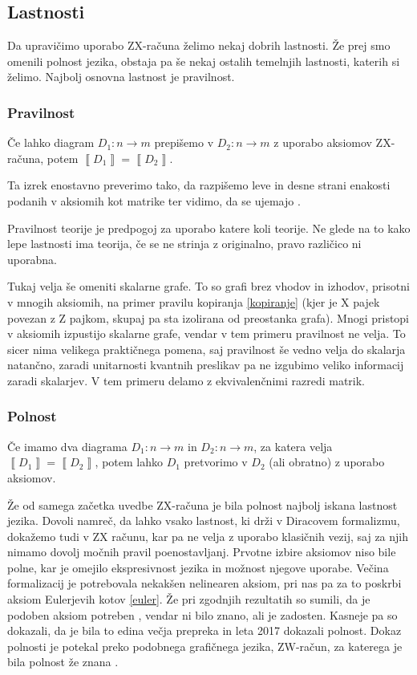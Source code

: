 \documentclass[mat1]{fmfdelo}
\newcommand{\interpret}[1]{\left\llbracket #1 \right\rrbracket}
\begin{document}
\subsection{Lastnosti}
Da upravičimo uporabo ZX-računa želimo nekaj dobrih lastnosti. Že prej smo omenili polnost jezika, obstaja pa še nekaj ostalih temelnjih lastnosti, katerih si želimo. Najbolj osnovna lastnost je pravilnost.
\subsubsection{Pravilnost}
\begin{izrek}[Pravilnost]
    Če lahko diagram \(D_1:n\to m\) prepišemo v \(D_2:n\to m\) z uporabo aksiomov ZX-računa, potem \(\interpret{D_1} = \interpret{D_2}\).
\end{izrek}
Ta izrek enostavno preverimo tako, da razpišemo leve in desne strani enakosti podanih v aksiomih kot matrike ter vidimo, da se ujemajo \cite[izrek 2.16]{Coecke_2011}.

Pravilnost teorije je predpogoj za uporabo katere koli teorije. Ne glede na to kako lepe lastnosti ima teorija, če se ne strinja z originalno, pravo različico ni uporabna.

Tukaj velja še omeniti skalarne grafe. To so grafi brez vhodov in izhodov, prisotni v mnogih aksiomih, na primer pravilu kopiranja \ref{kopiranje} (kjer je X pajek povezan z Z pajkom, skupaj pa sta izolirana od preostanka grafa). Mnogi pristopi v aksiomih izpustijo skalarne grafe, vendar v tem primeru pravilnost ne velja. To sicer nima velikega praktičnega pomena, saj pravilnost še vedno velja do skalarja natančno, zaradi unitarnosti kvantnih preslikav pa ne izgubimo veliko informacij zaradi skalarjev. V tem primeru delamo z ekvivalenčnimi razredi matrik.
\subsubsection{Polnost}
\begin{izrek}[Polnost]
    Če imamo dva diagrama \(D_1:n\to m\) in \(D_2:n\to m\), za katera velja \(\interpret{D_1} = \interpret{D_2}\), potem lahko \(D_1\) pretvorimo v \(D_2\) (ali obratno) z uporabo aksiomov.
\end{izrek}
Že od samega začetka uvedbe ZX-računa je bila polnost najbolj iskana lastnost jezika. Dovoli namreč, da lahko vsako lastnost, ki drži v Diracovem formalizmu, dokažemo tudi v ZX računu, kar pa ne velja z uporabo klasičnih vezij, saj za njih nimamo dovolj močnih pravil poenostavljanj. Prvotne izbire aksiomov niso bile polne, kar je omejilo ekspresivnost jezika in možnost njegove uporabe. Večina formalizacij je potrebovala nekakšen nelinearen aksiom, pri nas pa za to poskrbi aksiom Eulerjevih kotov \ref{euler}. Že pri zgodnjih rezultatih so sumili, da je podoben aksiom potreben \cite{Schr_der_de_Witt_2014}, vendar ni bilo znano, ali je zadosten. Kasneje pa so dokazali, da je bila to edina večja prepreka in leta 2017 dokazali polnost. Dokaz polnosti je potekal preko podobnega grafičnega jezika, ZW-račun, za katerega je bila polnost že znana \cite{kangfengng}.
\end{document}
